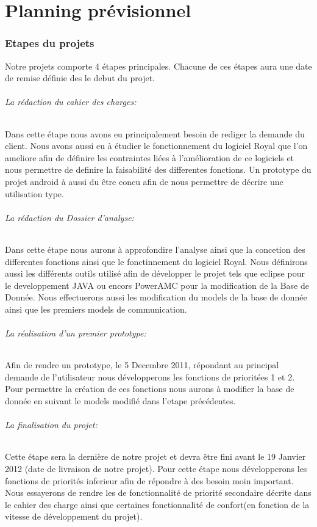 \part{Planning prévisionnel}

\section{Etapes du projets}

Notre projets comporte 4 étapes principales. Chacune de ces étapes aura une date de remise définie des le debut du projet. 

\paragraph{La rédaction du cahier des charges:}
Dans cette étape nous avons eu principalement besoin de rediger la demande du client. 
Nous avons aussi eu à étudier le fonctionnement du logiciel Royal que l'on ameliore afin de définire les contraintes liées à l'amélioration de ce logiciels et nous permettre de definire la faisabilité des differentes fonctions. 
Un prototype du projet android à aussi du être concu afin de nous permettre de décrire une utilisation type.

\paragraph{La rédaction du Dossier d'analyse:}
Dans cette étape nous aurons à approfondire l'analyse ainsi que la concetion des differentes fonctions ainsi que le fonctinnement du logiciel Royal. 
Nous définirons aussi les différents outils utilisé afin de développer le projet tels que eclipse pour le developpement JAVA ou encors PowerAMC pour la modification de la Base de Donnée.
Nous effectuerons aussi les modification du models de la base de donnée ainsi que les premiers models de communication.

\paragraph{La réalisation d'un premier prototype:}
Afin de rendre un prototype, le 5 Decembre 2011, répondant au principal demande de l'utilisateur nous développerons les fonctions de prioritées 1 et 2.
Pour permettre la création de ces fonctions nous aurons à modifier la base de donnée en suivant le models modifié dans l'etape précédentes.  

\paragraph{La finalisation du projet:}
Cette étape sera la dernière de notre projet et devra être fini avant le 19 Janvier 2012 (date de livraison de notre projet).
Pour cette étape nous développerons les fonctions de priorités inferieur afin de répondre à des besoin moin important. 
Nous essayerons de rendre les de fonctionnalité de priorité secondaire décrite dans le cahier des charge ainsi que certaines fonctionnalité de confort(en fonction de la vitesse de développement du projet).


